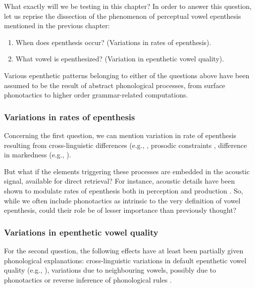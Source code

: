 What exactly will we be testing in this chapter? In order to answer this question, let us reprise the dissection of the phenomenon of perceptual vowel epenthesis mentioned in the previous chapter:

\begin{enumerate}
    \item When does epenthesis occur? (Variations in rates of epenthesis).
    \item What vowel is epenthesized? (Variation in epenthetic vowel quality).
\end{enumerate}

Various epenthetic patterns belonging to either of the questions above have been assumed to be the result of abstract phonological processes, from surface phonotactics to higher order grammar-related computations.

\subsubsection{Variations in rates of epenthesis}
Concerning the first question, we can mention variation in rate of epenthesis resulting from cross-linguistic differences (e.g., \cite{dupoux1999, dehaene2000, berent2007, kabak2007, dupoux2011, shin2011, durvasula2015, durvasula2016, durvasula2018}, prosodic constraints \cite{kabak2007, durvasula2016}, difference in markedness (e.g., \cite{berent2007, zhao2018}).

But what if the elements triggering these processes are embedded in the acoustic signal, available for direct retrieval?
For instance, acoustic details have been shown to modulate rates of epenthesis both in perception \cite{peperkamp2008, dejong2012} and production \cite{wilson2013, wilson2014}. So, while we often include phonotactics as intrinsic to the very definition of vowel epenthesis, could their role be of lesser importance than previously thought?

\subsubsection{Variations in epenthetic vowel quality}
For the second question, the following effects have at least been partially given phonological explanations: cross-linguistic variations in default epenthetic vowel quality (e.g., \cite{dupoux2011, guekozIS17}), variations due to neighbouring vowels, possibly due to phonotactics \cite{mattingley2015} or reverse inference of phonological rules \cite{durvasula2015, durvasula2018}.

